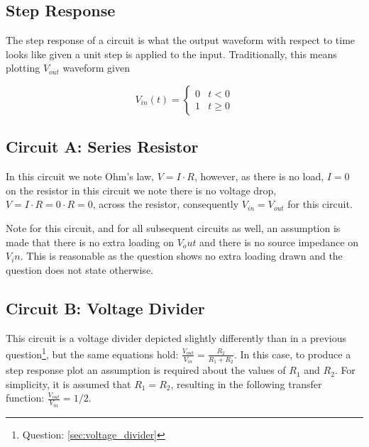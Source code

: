 \documentclass[main.tex]{subfiles}
\begin{document}
\subsection{Step Response}
The step response of a circuit is what the output waveform with respect to time looks like given a unit step is applied to the input. Traditionally, this means plotting $V_{out}$ waveform given 

\[ V_{in}(t) = \begin{cases} 0 & t < 0 \\ 1 & t \geq 0 \end{cases} \]


\subsection{Circuit A: Series Resistor}
In this circuit we note Ohm's law, $V = I \cdot R$, however, as there is no load, $I=0$ on the resistor in this circuit we note there is no voltage drop, $V=I \cdot R=0 \cdot R=0$, across the resistor, consequently $V_{in} = V_{out}$ for this circuit.  


Note for this circuit, and for all subsequent circuits as well, an assumption is made that there is no extra loading on $V_out$ and there is no source impedance on $V_in$. This is reasonable as the question shows no extra loading drawn and the question does not state otherwise.

\subsection{Circuit B: Voltage Divider}
This circuit is a voltage divider depicted slightly differently than in a previous question\footnote{Question: \ref{sec:voltage_divider}}, but the same equations hold: $\frac{V_{out}}{V_{in}} = \frac{R_2}{R_1 + R_2}$. In this case, to produce a step response plot an assumption is required about the values of $R_1$ and $R_2$. For simplicity, it is assumed that $R_1 = R_2$, resulting in the following transfer function: $\frac{V_{out}}{V_{in}} = 1/2$.
\end{document}
